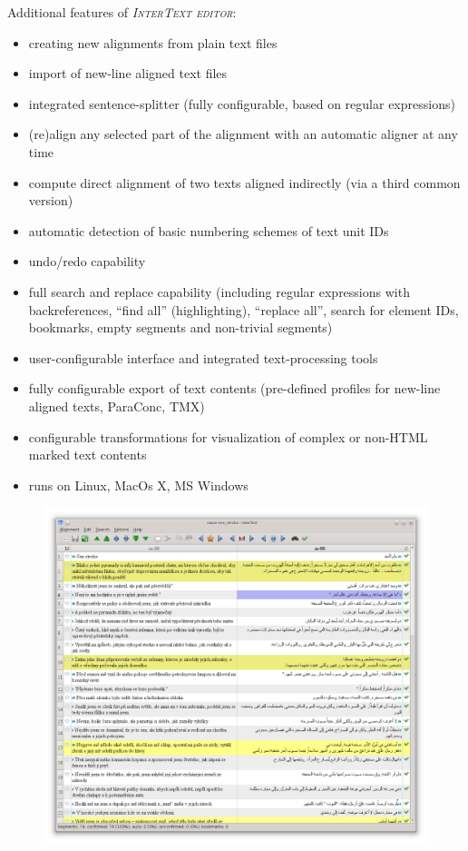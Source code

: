 \documentclass[a4paper,10pt,oneside]{book}
\newcommand{\ITeditor}{\textit{\textsc{InterText editor}}\xspace}
\begin{document}
Additional features of \ITeditor:
\begin{itemize}
	\item creating new alignments from plain text files
  \item import of new-line aligned text files
	\item integrated sentence-splitter (fully configurable, based on regular expressions)
	\item (re)align any selected part of the alignment with an automatic aligner at any time
  \item compute direct alignment of two texts aligned indirectly (via a third common version)
	\item automatic detection of basic numbering schemes of text unit IDs
	\item undo/redo capability
	\item full search and replace capability (including regular expressions with backreferences, ``find all'' (highlighting), ``replace all'', search for element IDs, bookmarks, empty segments and non-trivial segments)
	\item user-configurable interface and integrated text-processing tools
	\item fully configurable export of text contents (pre-defined profiles for new-line aligned texts, ParaConc, TMX)
  \item configurable transformations for visualization of complex or non-HTML marked text contents
	\item runs on Linux, MacOs X, MS Windows
\end{itemize}

\begin{figure}[htbf]
 \includegraphics[width=\textwidth]{screenshots/mainwindow_naum.png}
\end{figure}
\end{document}
